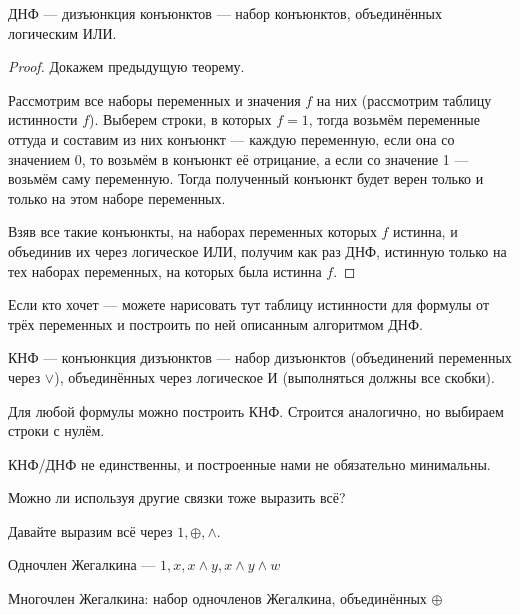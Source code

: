 \begin{definition}
	ДНФ --- дизъюнкция конъюнктов --- набор конъюнктов, объединённых логическим ИЛИ.
\end{definition}

\begin{proof}
	Докажем предыдущую теорему.

	Рассмотрим все наборы переменных и значения $f$ на них (рассмотрим таблицу истинности $f$). Выберем строки, в которых $f = 1$, тогда возьмём переменные оттуда и составим из них конъюнкт --- каждую переменную, если она со значением 0, то возьмём в конъюнкт её отрицание, а если со значение 1 --- возьмём саму переменную. Тогда полученный конъюнкт будет верен только и только на этом наборе переменных.

	Взяв все такие конъюнкты, на наборах переменных которых $f$ истинна, и объединив их через логическое ИЛИ, получим как раз ДНФ, истинную только на тех наборах переменных, на которых была истинна $f$. 
\end{proof}
\begin{example}
	Если кто хочет --- можете нарисовать тут таблицу истинности для формулы от трёх переменных и построить по ней описанным алгоритмом ДНФ. 
\end{example}

\begin{definition}
	КНФ --- конъюнкция дизъюнктов --- набор дизъюнктов (объединений переменных через $\lor$), объединённых через логическое И (выполняться должны все скобки).
\end{definition}

\begin{theorem}
	Для любой формулы можно построить КНФ. Строится аналогично, но выбираем строки с нулём. 
\end{theorem}

КНФ/ДНФ не единственны, и построенные нами не обязательно минимальны. 

Можно ли используя другие связки тоже выразить всё? 

Давайте выразим всё через $1, \oplus, \land$. 

\begin{definition}
	Одночлен Жегалкина --- $1, x, x \land y, x \land y \land w$
\end{definition}

\begin{definition}
	Многочлен Жегалкина: набор одночленов Жегалкина, объединённых $\oplus$
\end{definition}

